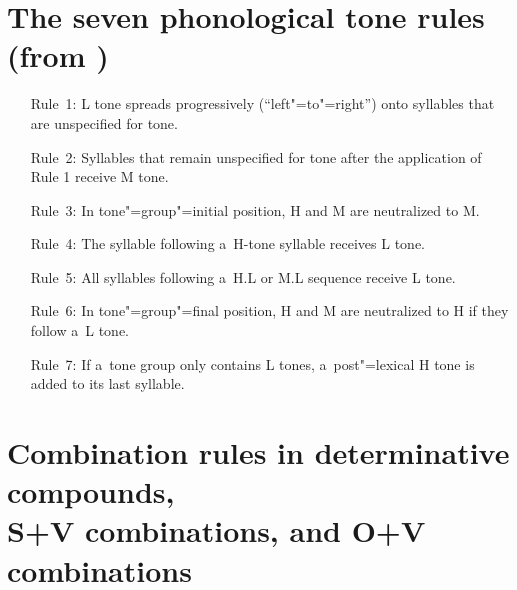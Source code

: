 \begin{refsection}
\clearpage

\section*{The seven phonological tone rules (from )}
\label{sec:tonerules}

\begin{enumerate}[leftmargin=2cm, itemsep=0pt, labelwidth=\widthof{Rule~1:}]%
	\item[Rule~1:] L tone spreads progressively (“left"=to"=right”) onto syllables that are unspecified for tone.
	\item[Rule~2:] Syllables that remain unspecified for tone after the application of Rule 1 receive M tone.
	\item[Rule~3:] In tone"=group"=initial position, H and M are neutralized to M.
	\item[Rule~4:] The syllable following a~H-tone syllable receives L tone.
	\item[Rule~5:] All syllables following a~H.L or M.L sequence receive L tone.
	\item[Rule~6:] In tone"=group"=final position, H and M are neutralized to H if they follow a~L tone.
	\item[Rule~7:] If a~tone group only contains L tones, a~post"=lexical H tone is added to its last syllable.
\end{enumerate}

\clearpage

\section*{Combination rules in determinative compounds,\\ S+V combinations, and O+V combinations}
\label{sec:tonesofCOMPOUNDS}


\end{refsection}
